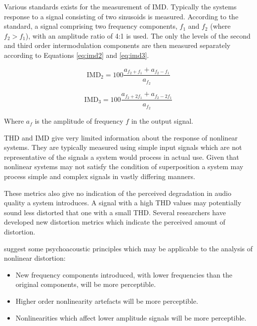		Various standards exists for the measurement of IMD. Typically the systems response to a signal consisting
		of two sinusoids is measured. According to the \citet{IEC2001amplifiers} standard, a signal comprising two
		frequency components, $f_{1}$ and $f_{2}$ (where $f_{2} > f_{1}$), with an amplitude ratio of 4:1 is used.
		The only the levels of the second and third order intermodulation components are then measured separately
		according to Equations \ref{eq:imd2} and \ref{eq:imd3}.

		\begin{equation}
			\textrm{IMD}_{2} = 100\frac{a_{f_{2} + f_{1}} + a_{f_{2} - f_{1}}}{a_{f_{2}}}
			\label{eq:imd2}
		\end{equation}

		\begin{equation}
			\textrm{IMD}_{3} = 100\frac{a_{f_{2} + 2f_{1}} + a_{f_{2} - 2f_{1}}}{a_{f_{2}}}
			\label{eq:imd3}
		\end{equation}

		Where $a_{f}$ is the amplitude of frequency $f$ in the output signal.

		THD and IMD give very limited information about the response of nonlinear systems. They are typically
		measured using simple input signals which are not representative of the signals a system would process in
		actual use. Given that nonlinear systems may not satisfy the condition of superposition a system may
		process simple and complex signals in vastly differing manners. 

		These metrics also give no indication of the perceived degradation in audio quality a system introduces. A
		signal with a high THD values may potentially sound less distorted that one with a small THD. Several
		researchers have developed new distortion metrics which indicate the perceived amount of distortion.

		\citet{geddes2003auditory} suggest some psychoacoustic principles which may be applicable to the analysis
		of nonlinear distortion:

		\begin{itemize}
			\item New frequency components introduced, with lower frequencies than the original components,
				will be more perceptible.
			\item Higher order nonlinearity artefacts will be more perceptible.
			\item Nonlinearities which affect lower amplitude signals will be more perceptible.
		\end{itemize}

